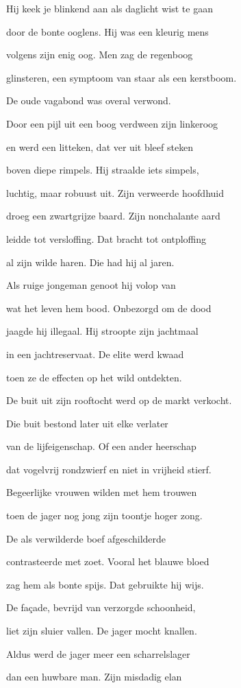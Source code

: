 Hij keek je blinkend aan
als daglicht wist te gaan

door de bonte ooglens.
Hij was een kleurig mens

volgens zijn enig oog.
Men zag de regenboog

glinsteren, een symptoom
van staar als een kerstboom.

De oude vagabond
was overal verwond.

Door een pijl uit een boog
verdween zijn linkeroog

en werd een litteken,
dat ver uit bleef steken

boven diepe rimpels.
Hij straalde iets simpels,

luchtig, maar robuust uit.
Zijn verweerde hoofdhuid

droeg een zwartgrijze baard.
Zijn nonchalante aard

leidde tot versloffing.
Dat bracht tot ontploffing

al zijn wilde haren.
Die had hij al jaren.

Als ruige jongeman
genoot hij volop van

wat het leven hem bood.
Onbezorgd om de dood

jaagde hij illegaal.
Hij stroopte zijn jachtmaal

in een jachtreservaat.
De elite werd kwaad

toen ze de effecten
op het wild ontdekten.

De buit uit zijn rooftocht
werd op de markt verkocht.

Die buit bestond later
uit elke verlater

van de lijfeigenschap.
Of een ander heerschap

dat vogelvrij rondzwierf
en niet in vrijheid stierf.

Begeerlijke vrouwen
wilden met hem trouwen

toen de jager nog jong
zijn toontje hoger zong.

De als verwilderde
boef afgeschilderde

contrasteerde met zoet.
Vooral het blauwe bloed

zag hem als bonte spijs.
Dat gebruikte hij wijs.

De façade, bevrijd
van verzorgde schoonheid,

liet zijn sluier vallen.
De jager mocht knallen.

Aldus werd de jager
meer een scharrelslager

dan een huwbare man.
Zijn misdadig elan

